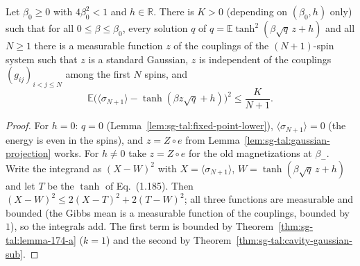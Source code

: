 \begin{theorem}[Lemma~1.7.6]
\label{thm:sg-tal:lemma-176}
  \leanok
{}
Let $\beta_0\ge0$ with $4\beta_0^2<1$ and $h\in\mathbb R$.  There is $K>0$ (depending on $(\beta_0,h)$ only) such that for all $0\le\beta\le\beta_0$, every solution $q$ of $q=\mathbb E\tanh^2(\beta\sqrt q\,z+h)$ and all $N\ge1$ there is a measurable function $z$ of the couplings of the $(N+1)$-spin system such that $z$ is a standard Gaussian, $z$ is independent of the couplings $(g_{ij})_{i<j\le N}$ among the first $N$ spins, and
\[
\mathbb E\bigl(\langle\sigma_{N+1}\rangle-\tanh(\beta z\sqrt q+h)\bigr)^2\le\frac K{N+1}.
\]
\end{theorem}
\begin{proof}
  \leanok
For $h=0$: $q=0$ (Lemma~\ref{lem:sg-tal:fixed-point-lower}), $\langle\sigma_{N+1}\rangle=0$ (the energy is even in the spins), and $z=Z\circ e$ from Lemma~\ref{lem:sg-tal:gaussian-projection} works.  For $h\ne0$ take $z=Z\circ e$ for the old magnetizations at $\beta_-$.  Write the integrand as $(X-W)^2$ with $X=\langle\sigma_{N+1}\rangle$, $W=\tanh(\beta\sqrt q\,z+h)$ and let $T$ be the $\tanh$ of Eq.~(1.185).  Then $(X-W)^2\le2(X-T)^2+2(T-W)^2$; all three functions are measurable and bounded (the Gibbs mean is a measurable function of the couplings, bounded by $1$), so the integrals add.  The first term is bounded by Theorem~\ref{thm:sg-tal:lemma-174-a} ($k=1$) and the second by Theorem~\ref{thm:sg-tal:cavity-gaussian-sub}.
\end{proof}

